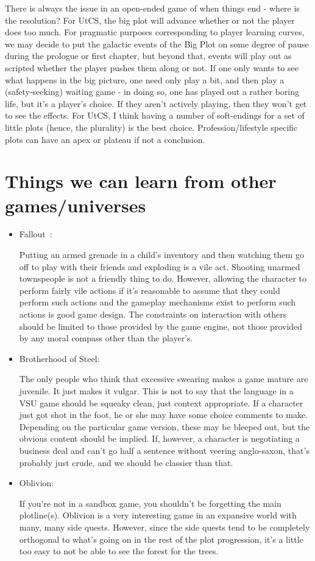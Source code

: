 There is always the issue in an open-ended game of when things end -
where is the resolution? For UtCS, the big plot will advance whether
or not the player does too much. For pragmatic purposes corresponding
to player learning curves, we may decide to put the galactic events of
the Big Plot on some degree of pause during the prologue or first
chapter, but beyond that, events will play out as scripted whether the
player pushes them along or not. If one only wants to see what happens
in the big picture, one need only play a bit, and then play a
(safety-seeking) waiting game - in doing so, one has played out a
rather boring life, but it's a player's choice. If they aren't
actively playing, then they won't get to see the effects.  For UtCS, I
think having a number of soft-endings for a set of little plots
(hence, the plurality) is the best choice. Profession/lifestyle
specific plots can have an apex or plateau if not a conclusion.


\section{Things we can learn from other games/universes}

\begin{itemize}
\item Fallout~\cite{FalloutRPG}:

Putting an armed grenade in a child's inventory and then watching them
go off to play with their friends and exploding is a vile
act. Shooting unarmed townspeople is not a friendly thing to
do. However, allowing the character to perform fairly vile actions if
it's reasonable to assume that they could perform such actions and the
gameplay mechanisms exist to perform such actions is good game
design. The constraints on interaction with others should be limited
to those provided by the game engine, not those provided by any moral
compass other than the player's.

\item Brotherhood of Steel:

The only people who think that excessive swearing makes a game mature
are juvenile. It just makes it vulgar. This is not to say that the
language in a VSU game should be squeaky clean, just context
appropriate. If a character just got shot in the foot, he or she may
have some choice comments to make. Depending on the particular game
version, these may be bleeped out, but the obvious content should be
implied. If, however, a character is negotiating a business deal and
can't go half a sentence without veering anglo-saxon, that's probably
just crude, and we should be classier than that.

\item Oblivion:

If you're not in a sandbox game, you shouldn't be forgetting the main
plotline(s).  Oblivion is a very interesting game in an expansive
world with many, many side quests. However, since the side quests tend
to be completely orthogonal to what's going on in the rest of the plot
progression, it's a little too easy to not be able to see the forest
for the trees.

\end{itemize}

